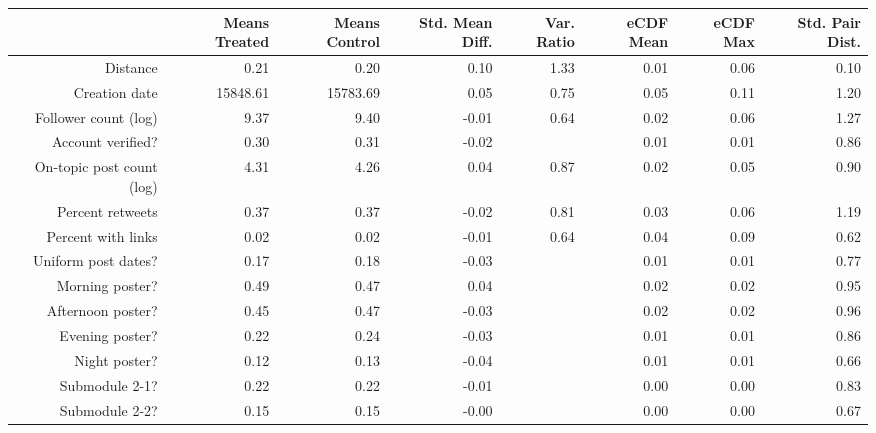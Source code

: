 \begin{table}[ht]
\centering
\begin{tabular}{rrrrrrrr}
  & Means Treated & Means Control & Std. Mean Diff. & Var. Ratio & eCDF Mean & eCDF Max & Std. Pair Dist. \\ 
  \hline
Distance & 0.21 & 0.20 & 0.10 & 1.33 & 0.01 & 0.06 & 0.10 \\ 
   \hline
Creation date & 15848.61 & 15783.69 & 0.05 & 0.75 & 0.05 & 0.11 & 1.20 \\ 
   \hline
Follower count (log) & 9.37 & 9.40 & -0.01 & 0.64 & 0.02 & 0.06 & 1.27 \\ 
   \hline
Account verified? & 0.30 & 0.31 & -0.02 &  & 0.01 & 0.01 & 0.86 \\ 
   \hline
On-topic post count (log) & 4.31 & 4.26 & 0.04 & 0.87 & 0.02 & 0.05 & 0.90 \\ 
   \hline
Percent retweets & 0.37 & 0.37 & -0.02 & 0.81 & 0.03 & 0.06 & 1.19 \\ 
   \hline
Percent with links & 0.02 & 0.02 & -0.01 & 0.64 & 0.04 & 0.09 & 0.62 \\ 
   \hline
Uniform post dates? & 0.17 & 0.18 & -0.03 &  & 0.01 & 0.01 & 0.77 \\ 
   \hline
Morning poster? & 0.49 & 0.47 & 0.04 &  & 0.02 & 0.02 & 0.95 \\ 
   \hline
Afternoon poster? & 0.45 & 0.47 & -0.03 &  & 0.02 & 0.02 & 0.96 \\ 
   \hline
Evening poster? & 0.22 & 0.24 & -0.03 &  & 0.01 & 0.01 & 0.86 \\ 
   \hline
Night poster? & 0.12 & 0.13 & -0.04 &  & 0.01 & 0.01 & 0.66 \\ 
   \hline
Submodule 2-1? & 0.22 & 0.22 & -0.01 &  & 0.00 & 0.00 & 0.83 \\ 
   \hline
Submodule 2-2? & 0.15 & 0.15 & -0.00 &  & 0.00 & 0.00 & 0.67 \\ 
   \hline
\end{tabular}
\end{table}

